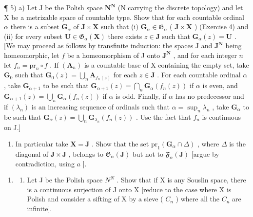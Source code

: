 ¶ 5) a) Let J be the Polish space \(\mathbf{N}^{\mathbf{N}}\) (N carrying the discrete topology) and let X be a metrizable space of countable type. Show that for each countable ordinal \(\alpha\) there is a subset \(\mathbf{G}_{\alpha}\) of \(\mathbf{J} \times \mathbf{X}\) such that (i) \(\mathbf{G}_{\alpha} \in \mathfrak{G}_{\alpha}\) ( \(\mathbf{J} \times \mathbf{X}\) ) (Exercise 4) and (ii) for every subset \(\mathbf{U} \in \mathfrak{G}_{\alpha}(\mathbf{X})\) there exists \(z \in \mathbf{J}\) such that \(\mathbf{G}_{\alpha}(z) = \mathbf{U}\) . {[}We may proceed as follows by transfinite induction: the spaces J and \(\mathbf{J}^{\mathbf{N}}\) being homeomorphic, let \(f\) be a homeomorphism of J onto \(\mathbf{J}^{\mathbf{N}}\) , and for each integer \(n\) let \(f_{n} = \mathrm{pr}_{n} \circ f\) . If \((\mathbf{A}_{n})\) is a countable base of X containing the empty set, take \(\mathbf{G}_{0}\) such that \(\mathbf{G}_{0}(z) = \bigcup_{n} \mathbf{A}_{f_{n}(z)}\) for each \(z \in \mathbf{J}\) . For each countable ordinal \(\alpha\) , take \(\mathbf{G}_{\alpha+1}\) to be such that \(\mathbf{G}_{\alpha+1}(z) = \bigcap_{n} \mathbf{G}_{\alpha}(f_{n}(z))\) if \(\alpha\) is even, and \(\mathbf{G}_{\alpha+1}(z) = \bigcup_{n} \mathbf{G}_{\alpha}(f_{n}(z))\) if \(\alpha\) is odd. Finally, if \(\alpha\) has no predecessor and if \((\lambda_{n})\) is an increasing sequence of ordinals such that \(\alpha = \sup_{n} \lambda_{n}\) , take \(\mathbf{G}_{\alpha}\) to be such that \(\mathbf{G}_{\alpha}(z) = \bigcup_{n} \mathbf{G}_{\lambda_{n}}(f_{n}(z))\) . Use the fact that \(f_{n}\) is continuous on J.{]}

\begin{enumerate}
\def\labelenumi{\alph{enumi})}
\setcounter{enumi}{1}
\tightlist
\item
  In particular take \(\mathbf{X} = \mathbf{J}\) . Show that the set \(\mathrm{pr}_1(\mathbf{G}_\alpha \cap \Delta)\) , where \(\Delta\) is the diagonal of \(\mathbf{J} \times \mathbf{J}\) , belongs to \(\mathfrak{G}_{\alpha}(\mathbf{J})\) but not to \(\mathfrak{F}_{\alpha}(\mathbf{J})\) {[}argue by contradiction, using \(a\) {]}.
\end{enumerate}

\begin{enumerate}
\def\labelenumi{\arabic{enumi})}
\setcounter{enumi}{5}
\tightlist
\item
  \begin{enumerate}
  \def\labelenumii{\alph{enumii})}
  \tightlist
  \item
    Let J be the Polish space \(N^{N}\) . Show that if X is any Souslin space, there is a continuous surjection of J onto X {[}reduce to the case where X is Polish and consider a sifting of X by a sieve ( \(C_{n}\) ) where all the \(C_{n}\) are infinite{]}.
  \end{enumerate}
\end{enumerate}

